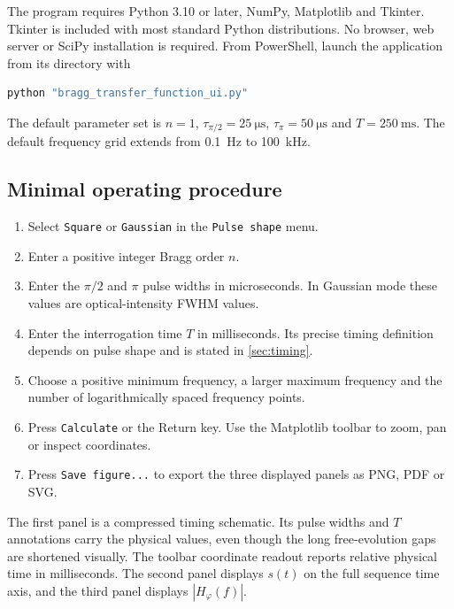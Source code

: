 \documentclass[11pt,a4paper]{article}
\newcommand{\Hphi}{H_{\varphi}}
\newcommand{\tauhalf}{\tau_{\pi/2}}
\newcommand{\taupi}{\tau_{\pi}}
\begin{document}
The program requires Python 3.10 or later, NumPy, Matplotlib and Tkinter. Tkinter is included with most standard Python distributions. No browser, web server or SciPy installation is required. From PowerShell, launch the application from its directory with

\begin{lstlisting}[language=bash]
python "bragg_transfer_function_ui.py"
\end{lstlisting}

The default parameter set is $n=1$, $\tauhalf=\SI{25}{\micro\second}$, $\taupi=\SI{50}{\micro\second}$ and $T=\SI{250}{\milli\second}$. The default frequency grid extends from \SI{0.1}{\hertz} to \SI{100}{\kilo\hertz}.

\subsection{Minimal operating procedure}

\begin{enumerate}
  \item Select \texttt{Square} or \texttt{Gaussian} in the \texttt{Pulse shape} menu.
  \item Enter a positive integer Bragg order $n$.
  \item Enter the $\pi/2$ and $\pi$ pulse widths in microseconds. In Gaussian mode these values are optical-intensity FWHM values.
  \item Enter the interrogation time $T$ in milliseconds. Its precise timing definition depends on pulse shape and is stated in \cref{sec:timing}.
  \item Choose a positive minimum frequency, a larger maximum frequency and the number of logarithmically spaced frequency points.
  \item Press \texttt{Calculate} or the Return key. Use the Matplotlib toolbar to zoom, pan or inspect coordinates.
  \item Press \texttt{Save figure...} to export the three displayed panels as PNG, PDF or SVG.
\end{enumerate}

The first panel is a compressed timing schematic. Its pulse widths and $T$ annotations carry the physical values, even though the long free-evolution gaps are shortened visually. The toolbar coordinate readout reports relative physical time in milliseconds. The second panel displays $s(t)$ on the full sequence time axis, and the third panel displays $|\Hphi(f)|$.
\end{document}
